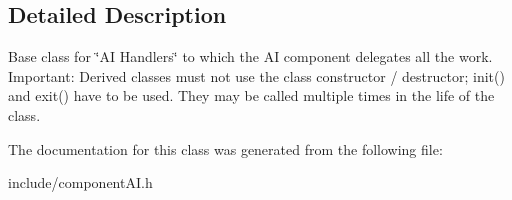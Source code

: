 \subsection{\-Detailed \-Description}
\-Base class for \char`\"{}\-A\-I Handlers\char`\"{} to which the \-A\-I component delegates all the work. \-Important\-: \-Derived classes must not use the class constructor / destructor; init() and exit() have to be used. \-They may be called multiple times in the life of the class. 

\-The documentation for this class was generated from the following file\-:\begin{DoxyCompactItemize}
\item 
include/component\-A\-I.\-h\end{DoxyCompactItemize}

